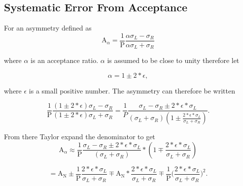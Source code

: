 \chapter{}
\ifpdf
\graphicspath{{Chapters/Appendix/Figs/Raster/}{Chapters/Appendix/Figs/PDF/}{Chapters/Appendix/Figs/}}
\else \graphicspath{{Chapters/Appendix/Figs/Vector/}{Chapters/Appendix/Figs/}}
\fi

\section{Systematic Error From Acceptance} \label{app::sysAcc}

For an asymmetry defined as
\begin{equation}
  \mathrm{A}_{\alpha} =
  \frac{1}{\mathrm{P}}
  \frac{\alpha\sigma_L - \sigma_R}{\alpha\sigma_L + \sigma_R} 
\end{equation}

\noindent
where $\alpha$ is an acceptance ratio.  $\alpha$ is assumed to be close to unity
therefore let

\begin{equation}
  \alpha = 1 \pm 2*\epsilon,
\end{equation}

\noindent
where $\epsilon$ is a small positive number.  The asymmetry can
therefore be written

\begin{equation}
  \frac{1}{\mathrm{P}}
  \frac{(1\pm2*\epsilon)\sigma_L -
    \sigma_R}{(1\pm2*\epsilon)\sigma_L + \sigma_R} = \frac{1}{P} \frac{\sigma_L
    - \sigma_R \pm 2*\epsilon * \sigma_L}{ (\sigma_L +
    \sigma_R)(1\pm\frac{2*\epsilon *\sigma_L}{\sigma_L + \sigma_R}) }.
\end{equation}

\noindent
From there Taylor expand the denominator to get
\begin{equation}
  \mathrm{A}_{\alpha} \approx
  \frac{1}{\mathrm{P}}
  \frac{\sigma_L - \sigma_R \pm
    2*\epsilon * \sigma_L}{ (\sigma_L + \sigma_R)} *(1\mp\frac{2*\epsilon
    *\sigma_L}{\sigma_L + \sigma_R})
\end{equation}

\begin{equation*}
  = 
  \mathrm{A}_{\mathrm{N}}
  \pm \frac{1}{\mathrm{P}} \frac{2*\epsilon *\sigma_L}{\sigma_L + \sigma_R}
  \mp \mathrm{A}_{\mathrm{N}}* \frac{2*\epsilon *\sigma_L}{\sigma_L + \sigma_R}
  \mp \frac{1}{\mathrm{P}}
  \Big( \frac{2*\epsilon *\sigma_L}{\sigma_L + \sigma_R} \Big )^2.
\end{equation*}

